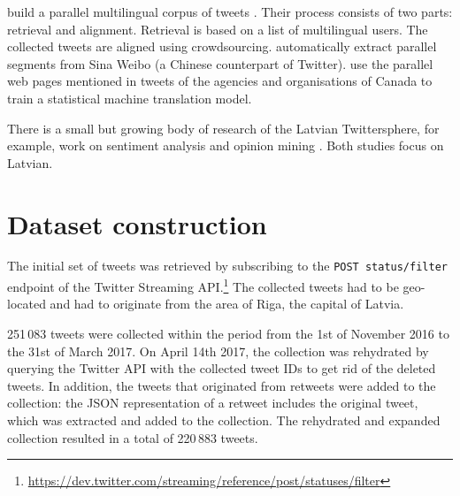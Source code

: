 \documentclass[11pt,a4paper]{article}
\begin{document}
\citet{SANVICENTE16.465} build a parallel multilingual corpus of tweets%
. Their process consists of two parts: retrieval and alignment. Retrieval is based on a list of multilingual users. The collected tweets are aligned using crowdsourcing. \citet{ling-EtAl:2013:ACL2013} automatically extract parallel segments from Sina Weibo (a Chinese counterpart of Twitter).
%
\citet{gotti-langlais-farzindar:2013:LASM} use the parallel web pages mentioned in tweets of the agencies and organisations of Canada to train a statistical machine translation model.

There is a small but growing body of research of the Latvian Twittersphere, for example, work on sentiment analysis \cite{Peisenieks2014} and opinion mining \cite{vspats2016opinion}. Both studies focus on Latvian.

\section{Dataset construction}
\label{sec:construction}

The initial set of tweets was retrieved by subscribing to the \texttt{POST status/filter} endpoint of the Twitter Streaming API.\footnote{\url{https://dev.twitter.com/streaming/reference/post/statuses/filter}}
The collected tweets had to be geo-located and had to originate from the area of Riga, the capital of Latvia.\footnotemark{}


251\,083 tweets were collected within the period from the 1st of November 2016 to the 31st of March 2017. On April 14th 2017, the collection was rehydrated\footnotemark{} by querying the Twitter API with the collected tweet IDs to get rid of the deleted tweets. In addition, the tweets that
%
%
originated from retweets were added to the collection: the JSON\footnotemark{} representation of a retweet includes the original tweet, which was extracted and added to the collection. The rehydrated and expanded collection resulted in a total of 220\,883 tweets. %
\end{document}

